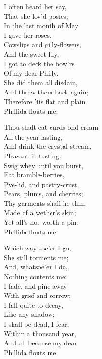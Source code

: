 \begin{dcverse}
\begin{patverse}
I often heard her say,\\
That she lov’d posies;\\
In the last month of May\\
I gave her roses,\\
Cowslips and gilly-flowers,\\
And the sweet lily,\\
I got to deck the bow’rs\\
Of my dear Philly.\\
She did them all disdain,\\
And threw them back again;\\
Therefore ’tis flat and plain\\
Phillida flouts me.
\end{patverse}

\begin{patverse}
Thou shalt eat curds ond cream\\
All the year lasting,\\
And drink the crystal stream,\\
Pleasant in tasting:\\
Swig whey until you burst,\\
Eat bramble-berries,\\
Pye-lid, and pastry-crust,\\
Pears, plums, and cherries;\\
Thy garments shall he thin,\\
Made of a wether’s skin;\\
Yet all’s not worth a pin:\\
Phillida flouts me.
\end{patverse}

\begin{patverse}
Which way soe’er I go,\\
She still torments me;\\
And, whatsoe’er I do,\\
Nothing contents me:\\
I fade, and pine away\\
With grief and sorrow;\\
I fall quite to decay,\\
Like any shadow;\\
I shall be dead, I fear,\\
Within a thousand year,\\
And all because my dear\\
Phillida flouts me.
\end{patverse}


\end{dcverse}
